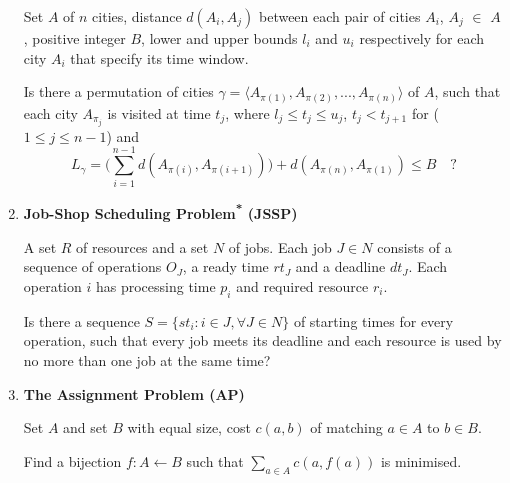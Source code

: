 \documentclass{mprop}
\theoremstyle{definition}
\begin{document}
\begin{enumerate}
\begin{instance}
Set $A$ of $n$ cities, distance $d(A_{i}, A_{j})$ between each pair of cities $A_{i}$, $A_{j}$ $\in$ $A$, positive integer $B$, lower and upper bounds $l_{i}$ and $u_{i}$ respectively for each city $A_{i}$ that specify its time window.
\end{instance}

\begin{question}
Is there a permutation of cities $\gamma = \langle A_{\pi(1)}, A_{\pi(2)},...,A_{\pi(n)} \rangle$ of $A$, such that each city $A_{\pi_{j}}$ is visited at time $t_{j}$, where $l_{j} \leq t_{j} \leq u_{j}$, $t_{j} < t_{j+1}$ for ($1 \leq j \leq n-1 $) and 
$$L_{\gamma} = \bigg( \sum_{i=1}^{n-1} d(A_{\pi(i)}, A_{\pi(i+1)}) \bigg) + d(A_{\pi(n)}, A_{\pi(1)}) \leq B \quad \textrm{?}$$

\end{question}

\item \textbf{Job-Shop Scheduling Problem\textsuperscript{*} (JSSP)}
\begin{instance}
A set $R$ of resources and a set $N$ of jobs. Each job $J \in N$ consists of a sequence of operations $O_{J}$, a ready time $rt_{J}$ and a deadline $dt_{J}$. Each operation $i$ has processing time $p_{i}$ and required resource $r_{i}$.
\end{instance}

\begin{question}
Is there a sequence $S = \{st_{i} : i \in J, \forall J \in N\}$ of starting times for every operation, such that every job meets its deadline and each resource is used by no more than one job at the same time?
\end{question}

\item \textbf{The Assignment Problem (AP)}

\begin{instance}
Set $A$ and set $B$ with equal size, cost $c(a,b)$ of matching $a \in A$ to $b \in B$.
\end{instance}

\begin{question}
Find a bijection $f: A \gets B$ such that $\sum_{a\in A} c(a,f(a))$ is minimised.
\end{question}
\end{enumerate}
\end{document}
